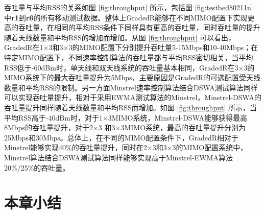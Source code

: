 吞吐量与平均RSS的关系如图 \ref{fig:throughput} 所示，包括图 \ref{fig:testbed80211n} 中\textbf{r1}到\textbf{r6}的所有移动测试数据。整体上GradedR能够在不同MIMO配置下实现更高的吞吐量，在相同的平均RSS条件下同样具有更高的吞吐量，同时吞吐量的提升随着天线数量和平均RSS的增加而增加。从图 \ref{fig:throughput} 可以看出，GradedR在1$\times$3和3$\times$3的MIMO配置下分别提升吞吐量5-15Mbps和10-40Mbps；在特定MIMO配置下，不同速率控制算法的吞吐量都与平均RSS密切相关，当平均RSS低于-60dBm时，单天线和双天线系统的吞吐量基本相同，GradedR在3$\times$3的MIMO系统下的最大吞吐量提升为5Mbps，主要原因是GradedR的可选配置受天线数量和平均RSS的限制。另一方面Minstrel速率控制算法结合DSWA测试算法同样可以实现吞吐量提升，相对于采用EWMA测试算法的Minstrel，Minstrel-DSWA的吞吐量提升同样随着天线数量和平均RSS而增加。如图 \ref{fig:throughput} 所示，当平均RSS高于-40dBm时，对于1$\times$3MIMO系统，Minstrel-DSWA能够获得最高8Mbps的吞吐量提升，对于2$\times$3 和3$\times$3MIMO系统，最高的吞吐量提升分别为25Mbps和30Mbps。总体上，在不同的MIMO配置条件下，GradedR相对于Minstrel能够实现40\%的吞吐量提升，同时在2$\times$3和3$\times$3的MIMO配置系统中，Minstrel算法结合DSWA测试算法同样能够实现高于Minstrel-EWMA算法20\%/25\%的吞吐量。


\section{本章小结}
\label{sec:conclusion3}

\nocite{10.1109/TMC.2009.87,Ahmed2008Online,Deek:2011,dujovne2010taxonomy,hiertz2010802.11,kim2006accurate,kim2009experimental,kolar2011mesh}
\nocite{Pelechrinis2010high,perahia2008next,sevani2012sir,zhang2008practical,Zhao2003delivery}

\nocite{Balan:2012:AHD:2348543.2348552,Bhartia:2011:HFD:2030613.2030642,Chai:2012:BES:2348543.2348564,Gollakota:2011:CRS:2018436.2018456}
\nocite{Gudipati:2011:SAR:2018436.2018455,Magistretti:2011:WRW:2030613.2030619,Magistretti:2010:IML:1859995.1860030,Manweiler:2011:ARH:1999995.2000020}
\nocite{Nguyen:2011:OCD:2030613.2030624,Qian:2011:PRU:1999995.2000026,Rozner:2010:NNP:1814433.1814445,Sanadhya:2012:ACI:2348543.2348565}